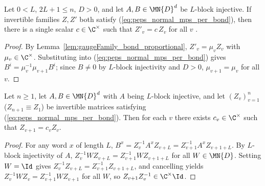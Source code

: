 \begin{corollary}%
    \label{cor:fundamentalTheorem_normalMPS_gauge_unique}
    \leanok
    Let $0 < L$, $2L + 1 \le n$, $D>0$, and let $A,B\in\MN{D}^d$ be $L$-block
    injective. If invertible families $Z,Z'$ both satisfy
    (\ref{eq:peps_normal_mps_per_bond}), then there is a single scalar
    $c\in\C^\times$ such that $Z'_v = c\,Z_v$ for all $v$
    \cite[Section~4]{Molnar2018NormalPEPS}.
\end{corollary}
\begin{proof}\leanok
    By Lemma~\ref{lem:gaugeFamily_bond_proportional}, $Z'_v = \mu_v Z_v$ with
    $\mu_v\in\C^\times$. Substituting into (\ref{eq:peps_normal_mps_per_bond})
    gives $B^i = \mu_v^{-1}\mu_{v+1} B^i$; since $B\neq 0$ by $L$-block
    injectivity and $D>0$, $\mu_{v+1}=\mu_v$ for all $v$.
\end{proof}

\begin{lemma}%
    \label{lem:gaugeFamily_succ_proportional}
    \leanok
    Let $n\ge 1$, let $A,B\in\MN{D}^d$ with $A$ being $L$-block injective, and
    let $(Z_v)_{v=1}^n$ ($Z_{n+1}\equiv Z_1$) be invertible matrices satisfying
    (\ref{eq:peps_normal_mps_per_bond}). Then for each $v$ there exists
    $c_v\in\C^\times$ such that $Z_{v+1} = c_v Z_v$.
\end{lemma}
\begin{proof}\leanok
    For any word $x$ of length $L$,
    $B^x = Z_v^{-1} A^x Z_{v+L} = Z_{v+1}^{-1} A^x Z_{v+1+L}$. By $L$-block
    injectivity of $A$, $Z_v^{-1} W Z_{v+L} = Z_{v+1}^{-1} W Z_{v+1+L}$ for all
    $W\in\MN{D}$. Setting $W=\Id$ gives $Z_v^{-1} Z_{v+L} = Z_{v+1}^{-1} Z_{v+1+L}$,
    and cancelling yields $Z_v^{-1} W Z_v = Z_{v+1}^{-1} W Z_{v+1}$ for all $W$,
    so $Z_{v+1} Z_v^{-1}\in\C^\times\Id$.
\end{proof}

